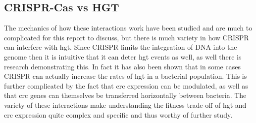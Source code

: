 \subsection{CRISPR-Cas vs HGT}
The mechanics of how these interactions work have been studied and are much to complicated for this report to discuss, but there is much variety in how CRISPR can interfere with \ac{hgt}.
Since CRISPR limits the integration of DNA into the genome then it is intuitive that it can deter \ac{hgt} events as well, as well there is research demonstrating this.
In fact it has also been shown that in some cases CRISPR can actually increase the rates of \ac{hgt} in a bacterial population.
This is further complicated by the fact that \ac{crc} expression can be modulated, as well as that \ac{crc} genes can themselves be transferred horizontally between bacteria.
The variety of these interactions make understanding the fitness trade-off of \ac{hgt} and \ac{crc} expression quite complex and specific and thus worthy of further study.


